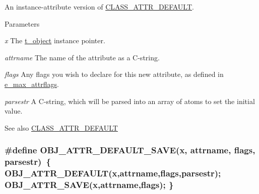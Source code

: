 An instance-\/attribute version of \hyperlink{group__attr_ga91196b43f49d6769e6fe2df99f5c7c77}{CLASS\_\-ATTR\_\-DEFAULT}. 
\begin{DoxyParams}{Parameters}
\item[{\em x}]The \hyperlink{structt__object}{t\_\-object} instance pointer. \item[{\em attrname}]The name of the attribute as a C-\/string. \item[{\em flags}]Any flags you wish to declare for this new attribute, as defined in \hyperlink{group__attr_gaf296cfc6741bb19207f6ed8062809115}{e\_\-max\_\-attrflags}. \item[{\em parsestr}]A C-\/string, which will be parsed into an array of atoms to set the initial value. \end{DoxyParams}
\begin{DoxySeeAlso}{See also}
\hyperlink{group__attr_ga91196b43f49d6769e6fe2df99f5c7c77}{CLASS\_\-ATTR\_\-DEFAULT} 
\end{DoxySeeAlso}
\hypertarget{group__attr_ga62154786f87f40e1a6ce71f407c31b6c}{
\subsubsection[{OBJ\_\-ATTR\_\-DEFAULT\_\-SAVE}]{\setlength{\rightskip}{0pt plus 5cm}\#define OBJ\_\-ATTR\_\-DEFAULT\_\-SAVE(x, \/  attrname, \/  flags, \/  parsestr)~\{ OBJ\_\-ATTR\_\-DEFAULT(x,attrname,flags,parsestr); OBJ\_\-ATTR\_\-SAVE(x,attrname,flags); \}}}
\label{group__attr_ga62154786f87f40e1a6ce71f407c31b6c}


